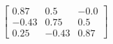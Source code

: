 \documentclass[preview]{standalone}
\begin{document}
\begin{align*}
\left[ \begin{array}{ccc}0.87 & 0.5 & -0.0 \\ -0.43 & 0.75 & 0.5 \\ 0.25 & -0.43 & 0.87\end{array} \right]
\end{align*}
\end{document}
